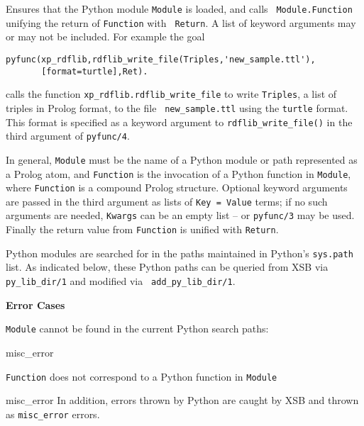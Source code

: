 \begin{description}

%
 Ensures that the Python module {\tt Module} is loaded, and calls {\tt
   Module.Function} unifying the return of {\tt Function} with {\tt
   Return}.  A list of keyword arguments may or may not be included.
 For example the goal

\begin{verbatim}
pyfunc(xp_rdflib,rdflib_write_file(Triples,'new_sample.ttl'),
       [format=turtle],Ret).
\end{verbatim}

calls the function {\tt xp\_rdflib.rdflib\_write\_file} to write
{\tt Triples}, a list of triples in Prolog format, to the file {\tt
  new\_sample.ttl} using the {\tt turtle} format.  This format is
specified as a keyword argument to {\tt rdflib\_write\_file()} in the
third argument of {\tt pyfunc/4}.

In general, {\tt Module} must be the name of a Python module or path
represented as a Prolog atom, and {\tt Function} is the invocation of
a Python function in {\tt Module}, where {\tt Function} is a compound
Prolog structure.  Optional keyword arguments are passed in the third
argument as lists of {\tt Key = Value} terms; if no such arguments are
needed, {\tt Kwargs} can be an empty list -- or {\tt pyfunc/3} may be
used.  Finally the return value from {\tt Function} is unified with
{\tt Return}.

Python modules are searched for in the paths maintained in Python's
{\tt sys.path} list.  As indicated below, these Python paths can be
queried from XSB via {\tt py\_lib\_dir/1} and modified via {\tt
  add\_py\_lib\_dir/1}.
     
{\bf Error Cases}
\bi
\item {\tt Module} cannot be found in the current Python search paths:
\bi
\item misc\_error
\ei
\item {\tt Function} does not correspond to a Python function in {\tt Module}
\bi
\item misc\_error
  \ei \ei
%
  In addition, errors thrown by Python are
  caught by XSB and thrown as {\tt misc\_error} errors.


\end{description}
